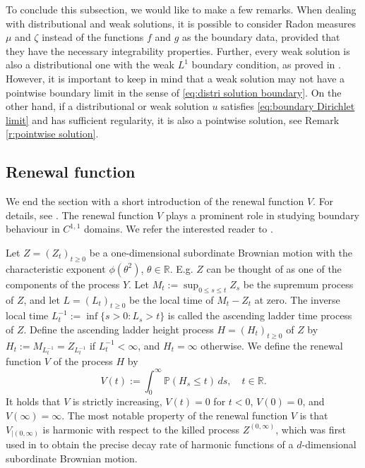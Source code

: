 \documentclass[12pt,a4paper,onecolumn]{amsart}
\theoremstyle{definition}
\newcommand{\R}{\mathbb{R}}
\newcommand{\p}{\mathbb{P}}
\newcommand{\1}{\mathbf 1}
\numberwithin{equation}{section}
\begin{document}
To conclude this subsection, we would like to make a few remarks. When dealing with distributional and weak solutions, it is possible to consider Radon measures $\mu$ and $\zeta$ instead of the functions $f$ and $g$ as the boundary data, provided that they have the necessary integrability properties. Further, every weak solution is also a distributional one with the weak $L^1$ boundary condition, as proved in \cite[Proposition 4.6]{Bio23}. However, it is important to keep in mind that a weak solution may not have a pointwise boundary limit in the sense of \eqref{eq:distri solution boundary}. On the other hand, if a distributional or weak solution $u$ satisfies \eqref{eq:boundary Dirichlet limit} and has sufficient regularity, it is also a pointwise solution, see Remark \ref{r:pointwise solution}.

\subsection{Renewal function}
We end the section with a short introduction of the renewal function $V$. For details, see \cite[Chapter VI]{Ber}. The renewal function $V$ plays a prominent role in studying boundary behaviour in $C^{1,1}$ domains. We refer the interested reader to \cite{ksv_twosided,KMR_suprema,semilinear_cvw,semilinear_bvw}.


Let $Z=(Z_t)_{t\ge 0}$ be a one-dimensional subordinate Brownian motion with the characteristic exponent $\phi(\theta^2)$, $\theta\in \R$. E.g. $Z$ can be thought of as one of the components of the process $Y$. Let $M_t:=\sup_{0\le s\le t} Z_s$ be the supremum process of $Z$, and let $L=(L_t)_{t\ge 0}$ be the local time of $M_t-Z_t$ at zero. The inverse local time $L_t^{-1}:=\inf\{s>0: L_s>t\}$ is called the ascending ladder time process of $Z$. Define the ascending ladder height process $H=(H_t)_{t\ge 0}$ of $Z$ by $H_t:=M_{L_t^{-1}}=Z_{L_t^{-1}}$ if $L_t^{-1}<\infty$, and $H_t=\infty$ otherwise. We define the renewal function $V$ of the process $H$ by
\begin{equation}\label{eq:V}
    V(t):=\int_0^{\infty}\p(H_s\le t)\, ds, \quad t\in \R.
\end{equation}
It holds that  $V$ is strictly increasing, $V(t)=0$ for $t<0$, $V(0)=0$, and $V(\infty)=\infty$. The most notable property of the renewal function $V$ is that $V_{|(0,\infty)}$ is harmonic with respect to the killed process $Z^{(0,\infty)}$, which was first used in \cite{ksv_twosided} to obtain the precise decay rate of harmonic functions of a $d$-dimensional subordinate Brownian motion. 
\end{document}
